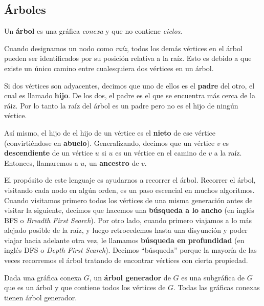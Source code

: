 \subsection{\'Arboles}
\label{section:arboles}

\begin{definition}[\'Arbol]
Un \textbf{\'arbol} es una gr\'afica \emph{conexa} y que no contiene \emph{ciclos}.
\end{definition}

Cuando designamos un nodo como \emph{ra\'iz}, todos los dem\'as v\'ertices en el \'arbol pueden ser identificados por su posici\'on relativa a la ra\'iz. Esto es debido a que existe un \'unico camino entre cualesquiera dos v\'ertices en un \'arbol.

Si dos vértices son adyacentes, decimos que uno de ellos es el \textbf{padre} del otro, el cual es llamado \textbf{hijo}. De los dos, el padre es el que se encuentra m\'as cerca de la r\'aiz. Por lo tanto la ra\'iz del \'arbol es un padre pero no es el hijo de ning\'un v\'ertice.

As\'i mismo, el hijo de el hijo de un v\'ertice es el \textbf{nieto} de ese v\'ertice (convirti\'endose en \textbf{abuelo}). Generalizando, decimos que un v\'ertice $v$ es \textbf{descendiente} de un v\'ertice $u$ si $u$ es un v\'ertice en el camino de $v$ a la ra\'iz. Entonces, llamaremos a $u$, un \textbf{ancestro} de $v$.

El propósito de este lenguaje es ayudarnos a recorrer el árbol. Recorrer el árbol, visitando cada nodo en algún orden, es un paso escencial en muchos algoritmos. Cuando visitamos primero todos los vértices de una misma generación antes de visitar la siguiente, decimos que hacemos una \textbf{b\'usqueda a lo ancho} (en inglés BFS o \textit{Breadth First Search}). Por otro lado, cuando primero viajamos a lo más alejado posible de la raíz, y luego retrocedemos hasta una disyunción y poder viajar hacia adelante otra vez, le llamamos \textbf{b\'usqueda en profundidad} (en inglés DFS o \textit{Depth First Search}). Decimos ``b\'usqueda'' porque la mayoría de las veces recorremos el árbol tratando de encontrar vértices con cierta propiedad.

\begin{definition}
Dada una gr\'afica conexa $G$, un \textbf{\'arbol generador} de $G$ es una subgr\'afica de $G$ que es un \'arbol y que contiene todos los v\'ertices de $G$. Todas las gr\'aficas conexas tienen \'arbol generador.
\end{definition}

